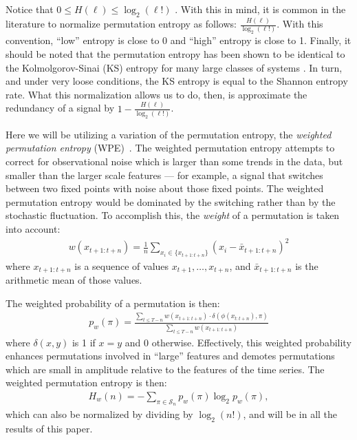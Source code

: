 Notice that $0\le H(\ell) \le \log_2(\ell!)$ \cite{bandt2002per}.  With this in mind, it is common in the literature to normalize permutation entropy as follows: $\frac{H(\ell)}{\log_2(\ell!)}$.  With this convention, ``low'' entropy is close to 0 and ``high'' entropy is close to 1. Finally, it should be noted that the permutation entropy has been shown to be identical to the Kolmolgorov-Sinai (KS) entropy for many large classes of systems \cite{amigo2012permutation}. In turn, and under very loose conditions, the KS entropy is equal to the Shannon entropy rate. What this normalization allows us to do, then, is approximate the redundancy of a signal by $1 - \frac{H(\ell)}{\log_2(\ell!)}$.

Here we will be utilizing a variation of the permutation entropy, the
\emph{weighted permutation entropy} (WPE)~\cite{fadlallah2013}. The weighted
permutation entropy attempts to correct for observational noise which is larger
than some trends in the data, but smaller than the larger scale features --- for
example, a signal that switches between two fixed points with noise about those
fixed points. The weighted permutation entropy would be dominated by the
switching rather than by the stochastic fluctuation. To accomplish this, the
\emph{weight} of a permutation is taken into account:
\begin{align*}
  w(x_{t+1:t+n}) = \frac{1}{n}
                 \sum_{x_i \in \{x_{t+1:t+n}\}}
                 \left( x_i - \bar{x}_{t+1:t+n} \right)^2
\end{align*}
where $x_{t+1:t+n}$ is a sequence of values $x_{t+1}, \ldots, x_{t+n}$, and
$\bar{x}_{t+1:t+n}$ is the arithmetic mean of those values.

The weighted probability of a permutation is then:
\begin{align*}
  p_w(\pi) = \frac{\displaystyle \sum_{t \le T - n} w(x_{t+1:t+n}) \cdot \delta(\phi(x_{t:t+n}), \pi) }{\displaystyle \sum_{t \le T - n} w(x_{t+1:t+n})}
\end{align*}
where $\delta(x, y)$ is 1 if $x = y$ and 0 otherwise. Effectively, this weighted
probability enhances permutations involved in ``large'' features and demotes
permutations which are small in amplitude relative to the features of the time
series. The weighted permutation entropy is then:
\begin{align*}
  H_w(n) = - \sum_{\pi \in \mathcal{S}_n} p_w(\pi) \log_2 p_w(\pi),
\end{align*}
which can also be normalized by dividing by $\log_2(n!)$, and will be in all the
results of this paper.

